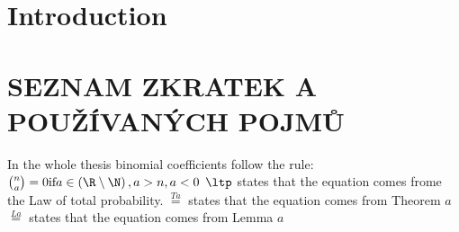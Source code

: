 \chapter*{Introduction}
\chapter*{SEZNAM ZKRATEK A POUŽÍVANÝCH POJMŮ}
In the whole thesis binomial coefficients follow the rule: $\binom{n}{a}=0 \text{if} a\in \left(\R \setminus \N \right), a>n, a<0$
$\ltp$ states that the equation comes frome the Law of total probability.
$\overset{Ta}{=}$ states that the equation comes from Theorem $a$
$\overset{La}{=}$ states that the equation comes from Lemma $a$
